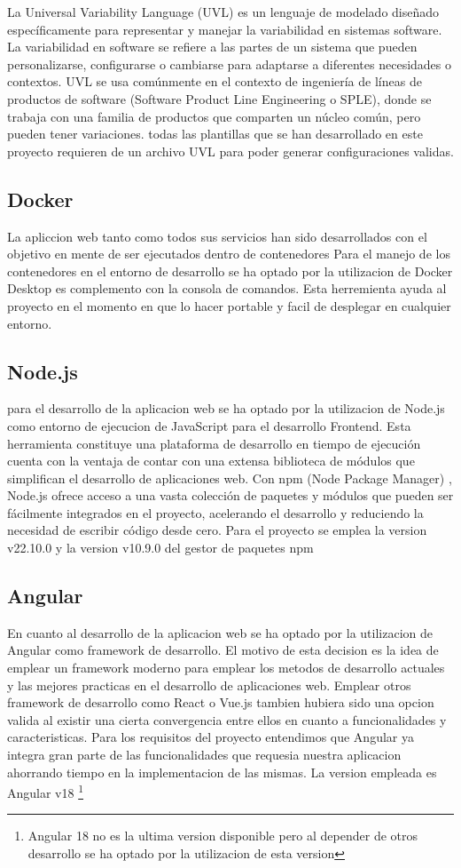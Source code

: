 \documentclass[12pt, a4paper, twoside]{article}
\begin{document}
La Universal Variability Language (UVL) \cite{uvl} es un lenguaje de modelado diseñado específicamente para representar y manejar la variabilidad en sistemas software. 
La variabilidad en software se refiere a las partes de un sistema que pueden personalizarse, configurarse o cambiarse para adaptarse a diferentes necesidades o contextos. 
UVL se usa comúnmente en el contexto de ingeniería de líneas de productos de software (Software Product Line Engineering o SPLE), donde se trabaja con una familia de productos que comparten un núcleo común, pero pueden tener variaciones.
todas las plantillas que se han desarrollado en este proyecto requieren de un archivo UVL para poder generar configuraciones validas.

\subsection{Docker}
La apliccion web tanto como todos sus servicios han sido desarrollados con el objetivo en mente de ser ejecutados dentro de contenedores
Para el manejo de los contenedores en el entorno de desarrollo se ha optado por la utilizacion de Docker Desktop es complemento con la consola de comandos.
Esta herremienta ayuda al proyecto en el momento en que lo hacer portable y facil de desplegar en cualquier entorno.
\subsection{Node.js}
\cite{nodejs}
para el desarrollo de la aplicacion web se ha optado por la utilizacion de Node.js como entorno de ejecucion de JavaScript para el desarrollo Frontend.
Esta herramienta constituye una plataforma de desarrollo en tiempo de ejecución cuenta con la ventaja de contar con una extensa biblioteca de módulos que simplifican el desarrollo de aplicaciones web.
Con npm (Node Package Manager) \cite{npm}, Node.js ofrece acceso a una vasta colección de paquetes y módulos que pueden ser fácilmente integrados en el proyecto, acelerando el desarrollo y reduciendo la necesidad de escribir código desde cero.
Para el proyecto se emplea la version v22.10.0 y la version v10.9.0 del gestor de paquetes npm
\subsection{Angular}
\cite{angular}
En cuanto al desarrollo de la aplicacion web se ha optado por la utilizacion de Angular como framework de desarrollo.
El motivo de esta decision es la idea de emplear un framework moderno para emplear los metodos de desarrollo actuales y las mejores practicas en el desarrollo de aplicaciones web.
Emplear otros framework de desarrollo como React o Vue.js tambien hubiera sido una opcion valida al existir una cierta convergencia entre ellos en cuanto a funcionalidades y caracteristicas.
Para los requisitos del proyecto entendimos que Angular ya integra gran parte de las funcionalidades que requesia nuestra aplicacion ahorrando tiempo en la implementacion de las mismas. La version empleada es Angular v18 \footnote{Angular 18 no es la ultima version disponible pero al depender de otros desarrollo se ha optado por la utilizacion de esta version}
\end{document}
